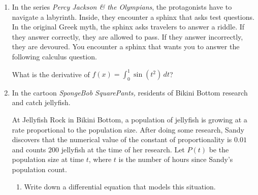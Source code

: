 \documentclass{article}
\begin{document}
\begin{enumerate}
\begin{enumerate}
    \item 
    \begin{problem}
        Write, but do not evaluate, a definite integral that would give the total amount of snow created by Elsa's snowburst. 
    \end{problem}
    \pspace{\vfill}

    \item 
    \begin{problem}
        Evaluate the integral you wrote in part (a) to find the total amount of snow created by Elsa's snowburst. Simplify your answer as much as possible and include units.
    \end{problem}
    \pspace{\vfill}
\end{enumerate}
\pspace{\newpage}

\item 
\begin{problem}
In the series \emph{Percy Jackson \& the Olympians}, the protagonists have to navigate a labyrinth. Inside, they encounter a sphinx that asks test questions. In the original Greek myth, the sphinx asks travelers to answer a riddle. If they answer correctly, they are allowed to pass. If they answer incorrectly, they are devoured. You encounter a sphinx that wants you to answer the following calculus question.

What is the derivative of $f(x)=\displaystyle\int_0^1 \sin(t^2)\,dt$?
\end{problem}
\pspace{\vfill}

\item 
\begin{problem}
    In the cartoon \emph{SpongeBob SquarePants,} residents of Bikini Bottom research and catch jellyfish.

    At Jellyfish Rock in Bikini Bottom, a population of jellyfish is growing at a rate proportional to the population size. After doing some research, Sandy discovers that the numerical value of the constant of proportionality is $0.01$ and counts $200$ jellyfish at the time of her research. Let $P(t)$ be the population size at time $t$, where $t$ is the number of hours since Sandy's population count.

    \begin{enumerate}
        
        \item 
        \begin{problem}
        Write down a differential equation that models this situation.
        \end{problem}


\end{enumerate}
\end{problem}
\end{enumerate}
\end{document}
